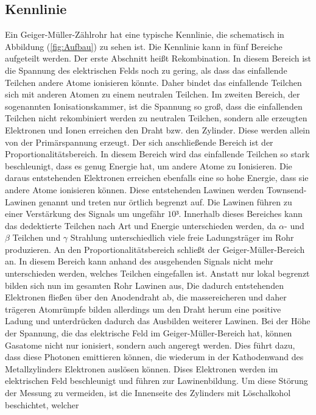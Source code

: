 \subsection{Kennlinie}
Ein Geiger-Müller-Zählrohr hat eine typische Kennlinie, die schematisch in Abbildung 
(\ref{fig:Aufbau}) zu sehen ist. Die Kennlinie kann in fünf Bereiche aufgeteilt werden. 
Der erste Abschnitt heißt Rekombination. In diesem Bereich ist die Spannung des elektrischen 
Felds noch zu gering, als dass das einfallende Teilchen andere Atome ionisieren könnte. 
Daher bindet das einfallende Teilchen sich mit anderen Atomen zu einem neutralen Teilchen. 
Im zweiten Bereich, der sogenannten Ionisationskammer, ist die Spannung so groß, 
dass die einfallenden Teilchen nicht rekombiniert werden zu neutralen Teilchen, sondern
alle erzeugten Elektronen und Ionen erreichen den Draht bzw. den Zylinder. Diese werden 
allein von der Primärspannung erzeugt. Der sich anschließende Bereich ist der 
Proportionalitätsbereich. In diesem Bereich wird das einfallende Teilchen so stark 
beschleunigt, dass es genug Energie hat, um andere Atome zu Ionisieren. Die daraus 
entstehenden Elektronen erreichen ebenfalls eine so hohe Energie, dass sie 
andere Atome ionisieren können. Diese entstehenden Lawinen werden Townsend-Lawinen genannt 
und treten nur örtlich begrenzt auf. Die Lawinen führen zu einer Verstärkung des 
Signals um ungefähr $10³$. Innerhalb dieses Bereiches kann das dedektierte Teilchen 
nach Art und Energie unterschieden werden, da $\alpha$- und $\beta$ Teilchen und $\gamma$ 
Strahlung unterschiedlich viele freie Ladungsträger im Rohr produzieren.  
An den Proportionalitätsbereich schließt der Geiger-Müller-Bereich an. In diesem Bereich 
kann anhand des ausgehenden Signals nicht mehr unterschieden werden, welches Teilchen 
eingefallen ist. Anstatt nur lokal begrenzt bilden sich nun im gesamten Rohr Lawinen aus, 
Die dadurch entstehenden Elektronen fließen über den Anodendraht ab, die massereicheren und daher 
trägeren Atomrümpfe bilden allerdings um den Draht herum eine positive Ladung und unterdrücken
dadurch das Ausbilden weiterer Lawinen. Bei der Höhe der Spannung, die das elektrische 
Feld im Geiger-Müller-Bereich hat, können Gasatome nicht nur ionisiert, sondern auch 
angeregt werden. Dies führt dazu, dass diese Photonen emittieren können, die wiederum in 
der Kathodenwand des Metallzylinders Elektronen auslösen können. Dises Elektronen werden
im elektrischen Feld beschleunigt und führen zur Lawinenbildung. Um diese Störung der
Messung zu vermeiden, ist die Innenseite des Zylinders mit Löschalkohol beschichtet, welcher
